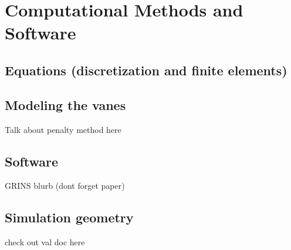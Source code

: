 \section{Computational Methods and Software}
\label{sec:method}

\subsection{Equations (discretization and finite elements)}

\subsection{Modeling the vanes}

Talk about penalty method here

\subsection{Software}

GRINS blurb (dont forget paper)

\subsection{Simulation geometry}

check out val doc here
